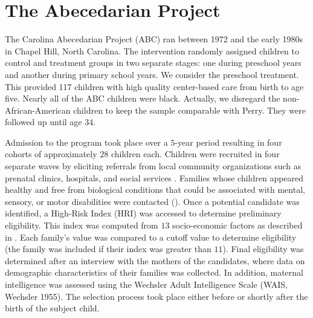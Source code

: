 \clearpage
{}


\restoregeometry


\restoregeometry

\section{The Abecedarian Project} \label{sec:ABC}

The Carolina Abecedarian Project (ABC) ran between 1972 and the early 1980s in Chapel Hill, North Carolina. The intervention randomly assigned children to control and treatment groups in two separate stages: one during preschool years and another during primary school years. We consider the preschool treatment. This provided 117 children with high quality center-based care from birth to age five. Nearly all of the ABC children were black. Actually, we disregard the non-African-American children to keep the sample comparable with Perry. They were followed up until age 34. 

Admission to the program took place over a $5$-year period resulting in four cohorts of approximately $28$ children each. Children were recruited in four separate waves by eliciting referrals from local community organizations such as prenatal clinics, hospitals, and social services \citep{Breitmayer_Ramey_1986_CD}. Families whose children appeared healthy and free from biological conditions that could be associated with mental, sensory, or motor disabilities were contacted (\citet{Ramey_Campbell_1984}). Once a potential candidate was identified, a High-Risk Index (HRI) was accessed to determine preliminary eligibility. This index was computed from $13$ socio-economic factors as described in \citet{Ramey_Smith_1977_AJMD}.
Each family's value was compared to a cutoff value to determine eligibility (the family was included if their index was greater than $11$). Final eligibility was determined after an interview with the mothers of the candidates, where data on demographic characteristics of their families was collected. In addition, maternal intelligence was assessed using the Wechsler Adult Intelligence Scale (WAIS, Wechsler 1955). The selection process took place either before or shortly after the birth of the subject child.


